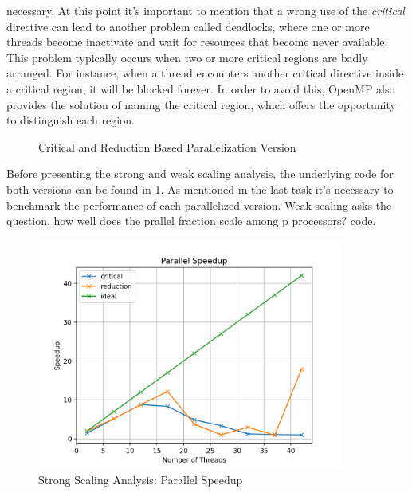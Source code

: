 \documentclass[unicode,11pt,a4paper,oneside,numbers=endperiod,openany]{scrartcl}
\begin{document}
necessary. At this point it's important to mention that a wrong use of the \textit{critical} directive can lead to another 
problem called deadlocks, where one or more threads become inactivate and wait for resources that become never available. 
This problem typically occurs when two or more critical regions are badly arranged. For instance, when a thread encounters 
another critical directive inside a critical region, it will be blocked forever. In order to avoid this, OpenMP also provides 
the solution of naming the critical region, which offers the opportunity to distinguish each region. \cite{HPC}
\begin{figure}[H]
  \centering
  {\fontsize{8}{10}\selectfont
  }
  \caption{Critical and Reduction Based Parallelization Version}
  \label{fig:critical_reduction}
\end{figure}
Before presenting the strong and weak scaling analysis, the underlying code for both versions can be found in 
\ref{fig:critical_reduction}. As mentioned in the last task it's necessary to benchmark the performance of each parallelized 
version. Weak scaling asks the question, how well does the prallel fraction scale among p processors? 
code. 
\newpage
\begin{figure}[H]
    \centering
    \includegraphics[width=0.9\textwidth]{Images_Output/parallel_speedup.png}
    \caption{Strong Scaling Analysis: Parallel Speedup}
    \label{fig:strong_scaling}
  \end{figure}
\end{document}
